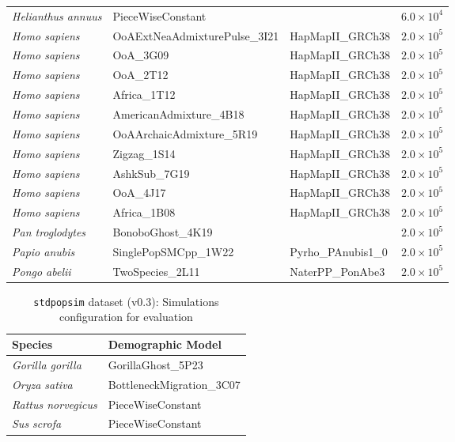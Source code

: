 \documentclass{article}
\newcommand{\stdpopsim}{\texttt{stdpopsim}\xspace}
\begin{document}
\begin{table}[t]
{\begin{tabular}{llll}
        \emph{Helianthus annuus}    & PieceWiseConstant & & $6.0\times10^{4}$ \\
        \emph{Homo sapiens}    & OoAExtNeaAdmixturePulse\_3I21 & HapMapII\_GRCh38 & $2.0\times10^{5}$ \\
        \emph{Homo sapiens}    & OoA\_3G09 & HapMapII\_GRCh38 & $2.0\times10^{5}$ \\
        \emph{Homo sapiens}    & OoA\_2T12 & HapMapII\_GRCh38 & $2.0\times10^{5}$ \\
        \emph{Homo sapiens}    & Africa\_1T12 & HapMapII\_GRCh38 & $2.0\times10^{5}$ \\
        \emph{Homo sapiens}    & AmericanAdmixture\_4B18 & HapMapII\_GRCh38 & $2.0\times10^{5}$ \\
        \emph{Homo sapiens}    & OoAArchaicAdmixture\_5R19 & HapMapII\_GRCh38 & $2.0\times10^{5}$ \\
        \emph{Homo sapiens}    & Zigzag\_1S14 & HapMapII\_GRCh38 & $2.0\times10^{5}$ \\
        \emph{Homo sapiens}    & AshkSub\_7G19 & HapMapII\_GRCh38 & $2.0\times10^{5}$ \\
        \emph{Homo sapiens}    & OoA\_4J17 & HapMapII\_GRCh38 & $2.0\times10^{5}$ \\
        \emph{Homo sapiens}    & Africa\_1B08 & HapMapII\_GRCh38 & $2.0\times10^{5}$ \\
        \emph{Pan troglodytes}    & BonoboGhost\_4K19 & & $2.0\times10^{5}$ \\
        \emph{Papio anubis}    & SinglePopSMCpp\_1W22 & Pyrho\_PAnubis1\_0 & $2.0\times10^{5}$ \\
        \emph{Pongo abelii}    & TwoSpecies\_2L11 & NaterPP\_PonAbe3 & $2.0\times10^{5}$ \\
        \bottomrule
    \end{tabular}
    }
\end{table}



\begin{table}[h!]
    \centering
    \caption{\stdpopsim dataset (v0.3): Simulations configuration for evaluation}
    \label{tab:stdpopsim-dataset-v0.3}
    \begin{tabular}{ll}
        \toprule
        \textbf{Species} & \textbf{Demographic Model}\\
        \midrule
        \emph{Gorilla gorilla}    & GorillaGhost\_5P23 \\
        \emph{Oryza sativa}    & BottleneckMigration\_3C07  \\
        \emph{Rattus norvegicus}    & PieceWiseConstant  \\
        \emph{Sus scrofa}    & PieceWiseConstant \\
        \bottomrule
    \end{tabular}
\end{table}
\end{document}
